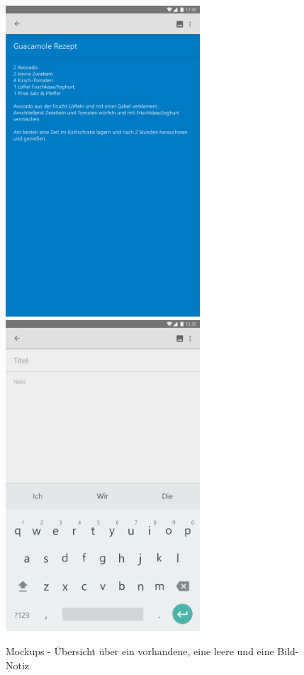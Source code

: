\begin{figure}[H]
\centering
\begin{minipage}[t]{1\textwidth} %
\caption{Mockups - Übersicht über ein vorhandene, eine leere und eine Bild-Notiz} %
\includegraphics[width=7.25cm]{img/NoteActivity} %
\includegraphics[width=7.25cm]{img/NoteActivityNew}\\ %

\end{minipage}
\end{figure}
